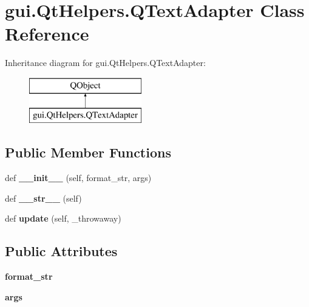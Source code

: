 \hypertarget{classgui_1_1_qt_helpers_1_1_q_text_adapter}{}\section{gui.\+Qt\+Helpers.\+Q\+Text\+Adapter Class Reference}
\label{classgui_1_1_qt_helpers_1_1_q_text_adapter}
Inheritance diagram for gui.\+Qt\+Helpers.\+Q\+Text\+Adapter\+:\begin{figure}[H]
\begin{center}
\leavevmode
\includegraphics[height=2.000000cm]{d2/dec/classgui_1_1_qt_helpers_1_1_q_text_adapter}
\end{center}
\end{figure}
\subsection*{Public Member Functions}
\begin{DoxyCompactItemize}
\item 
\mbox{\label{classgui_1_1_qt_helpers_1_1_q_text_adapter_a176fce91140d80f6daa5d422a5f4796b}} 
def {\bfseries \+\_\+\+\_\+init\+\_\+\+\_\+} (self, format\+\_\+str, args)
\item 
\mbox{\label{classgui_1_1_qt_helpers_1_1_q_text_adapter_acfc7c5da30b59cf83ac757b6f7cf55e2}} 
def {\bfseries \+\_\+\+\_\+str\+\_\+\+\_\+} (self)
\item 
\mbox{\label{classgui_1_1_qt_helpers_1_1_q_text_adapter_addb29a61c8aab81931f73308b6ed8fa7}} 
def {\bfseries update} (self, \+\_\+throwaway)
\end{DoxyCompactItemize}
\subsection*{Public Attributes}
\begin{DoxyCompactItemize}
\item 
\mbox{\label{classgui_1_1_qt_helpers_1_1_q_text_adapter_a11bcce85b655b60e204f76a91ad457a4}} 
{\bfseries format\+\_\+str}
\item 
\mbox{\label{classgui_1_1_qt_helpers_1_1_q_text_adapter_a7069d528ca26898b87ab9a44c2c6fe29}} 
{\bfseries args}
\end{DoxyCompactItemize}
